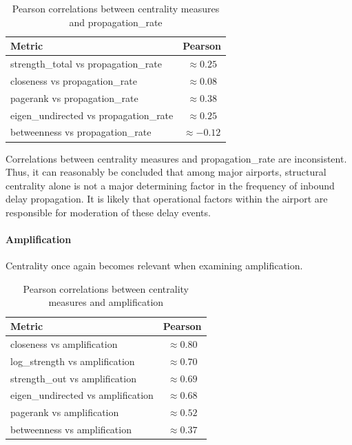 \documentclass[9pt]{article}
\begin{document}
\begin{table}[h!]
    \centering
    \caption{Pearson correlations between centrality measures and propagation\_rate}
    \begin{tabular}{l c}
        \toprule
        Metric & Pearson \\
        \midrule
        strength\_total vs propagation\_rate   & $\approx 0.25$ \\
        closeness vs propagation\_rate         & $\approx 0.08$ \\
        pagerank vs propagation\_rate          & $\approx 0.38$ \\
        eigen\_undirected vs propagation\_rate & $\approx 0.25$ \\
        betweenness vs propagation\_rate       & $\approx -0.12$ \\
        \bottomrule
    \end{tabular}
\end{table}

Correlations between centrality measures and propagation\_rate are inconsistent. Thus, it can reasonably be concluded that among major airports, structural centrality alone is not a major determining factor in the frequency of inbound delay propagation. It is likely that operational factors within the airport are responsible for moderation of these delay events.

\paragraph{Amplification}

Centrality once again becomes relevant when examining amplification.

\begin{table}[h!]
    \centering
    \caption{Pearson correlations between centrality measures and amplification}
    \begin{tabular}{l c}
        \toprule
        Metric & Pearson \\
        \midrule
        closeness vs amplification        & $\approx 0.80$ \\
        log\_strength vs amplification    & $\approx 0.70$ \\
        strength\_out vs amplification    & $\approx 0.69$ \\
        eigen\_undirected vs amplification& $\approx 0.68$ \\
        pagerank vs amplification         & $\approx 0.52$ \\
        betweenness vs amplification      & $\approx 0.37$ \\
        \bottomrule
    \end{tabular}
\end{table}
\end{document}
